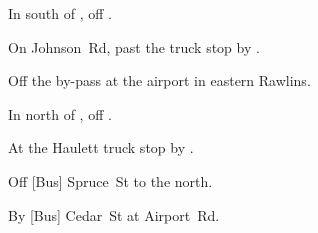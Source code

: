 
\begin{LocationList}

In  south of , off   .

On Johnson~Rd, past the truck stop by   .

Off the  by-pass at the airport in eastern Rawlins.

In  north of , off   .

At the Haulett truck stop by   .

Off [Bus]  Spruce~St to the north.

By [Bus]  Cedar~St at Airport~Rd.

\end{LocationList}

